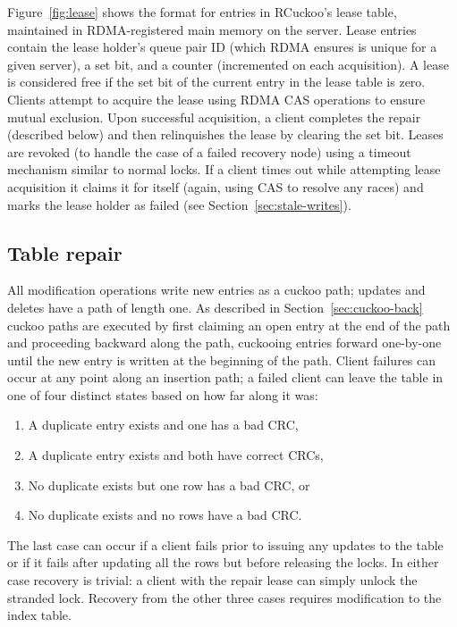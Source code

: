 Figure~\ref{fig:lease} shows the format for entries in
RCuckoo's lease table, maintained in RDMA-registered main memory on
the server.  Lease entries contain the lease holder's queue pair ID
(which RDMA ensures is unique for a given server), a set bit, and a
counter (incremented on each acquisition).  A lease is considered free
if the set bit of the current entry in the lease table is zero.
Clients attempt to acquire the lease using RDMA CAS operations to
ensure mutual exclusion.
Upon successful acquisition, a client completes the repair (described
below) and then relinquishes the lease by clearing the set bit.
Leases are revoked (to handle the case of a failed recovery node)
using a timeout mechanism similar to normal locks.  If a client times
out while attempting lease acquisition it claims it for itself (again,
using CAS to resolve any races) and marks the lease holder as failed
(see Section~\ref{sec:stale-writes}).


\subsection{Table repair} 
\label{sec:table-repair}


All modification operations write new entries as a cuckoo path;
updates and deletes have a path of length one.  As described in
Section~\ref{sec:cuckoo-back} cuckoo paths are executed by first
claiming an open entry at the end of the path and proceeding backward
along the path, cuckooing entries forward one-by-one until the new
entry is written at the beginning of the path.  Client failures can
occur at any point along an insertion path; a failed client can leave
the table in one of four distinct states based on how far along it was:
\begin{enumerate}[itemsep=1pt]
\item{A duplicate entry exists and one has a bad CRC,}
    \item{A duplicate entry exists and both have correct CRCs,} 
    \item{No duplicate exists but one row has a bad CRC, or}
      \item{No duplicate exists and no rows have a bad CRC.}
\end{enumerate}
\noindent The last case can occur if a client fails prior to issuing
any updates to the table or if it fails after updating all the rows
but before releasing the locks.  In either case recovery is trivial: a
client with the repair lease can simply unlock the stranded lock.
Recovery from the other three cases requires modification to the index
table.

